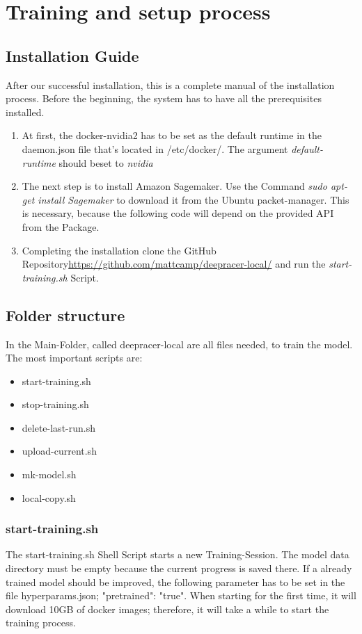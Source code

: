 \section{Training and setup process}

\subsection{Installation Guide}
After our successful installation, this is a complete manual of the installation process. \newline Before the beginning, the system has to have all the prerequisites installed.

\begin{enumerate}
    \item At first, the docker-nvidia2 has to be set as the default runtime in the daemon.json file that's located in /etc/docker/.
    \newline The argument \textsl{default-runtime} should beset to \textsl{nvidia} 
    \item The next step is to install Amazon Sagemaker. Use the Command \textsl{sudo apt-get install Sagemaker}  to download it from the Ubuntu packet-manager. This is necessary, because the following code will depend on the provided API from the Package.
    \item Completing the installation clone the GitHub Repository\url{https://github.com/mattcamp/deepracer-local/} and run the \textsl{start-training.sh} Script.
\end{enumerate}


\subsection{Folder structure}
In the Main-Folder, called deepracer-local are all files needed, to train the model.
The most important scripts are:

\begin{itemize}
    \item start-training.sh
    \item stop-training.sh
    \item delete-last-run.sh
    \item upload-current.sh
    \item mk-model.sh
    \item local-copy.sh
\end{itemize}

\subsubsection{start-training.sh}
The start-training.sh Shell Script starts a new Training-Session. The model data directory must be empty because the current progress is saved there. If a already trained model should be improved, the following parameter has to be set in the file hyperparams.json; "pretrained": "true". When starting for the first time, it will download 10GB of docker images; therefore, it will take a while to start the training process.

